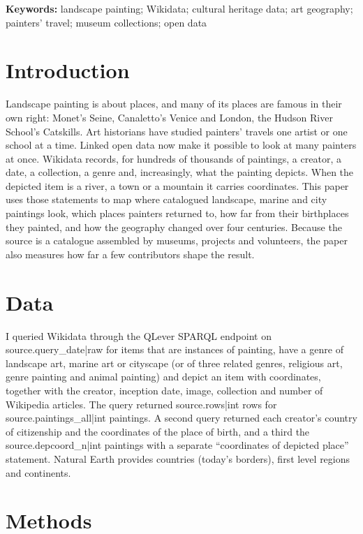 \documentclass[11pt,a4paper]{article}
\begin{document}
\textbf{Keywords:} landscape painting; Wikidata; cultural heritage data; art geography; painters' travel; museum collections; open data

\section{Introduction}
Landscape painting is about places, and many of its places are famous in their own right: Monet's Seine, Canaletto's Venice and London, the Hudson River School's Catskills. Art historians have studied painters' travels one artist or one school at a time. Linked open data now make it possible to look at many painters at once. Wikidata records, for hundreds of thousands of paintings, a creator, a date, a collection, a genre and, increasingly, what the painting depicts. When the depicted item is a river, a town or a mountain it carries coordinates. This paper uses those statements to map where catalogued landscape, marine and city paintings look, which places painters returned to, how far from their birthplaces they painted, and how the geography changed over four centuries. Because the source is a catalogue assembled by museums, projects and volunteers, the paper also measures how far a few contributors shape the result.

\section{Data}
I queried Wikidata \citep{wikidata} through the QLever SPARQL endpoint \citep{qlever} on {{source.query_date|raw}} for items that are instances of painting, have a genre of landscape art, marine art or cityscape (or of three related genres, religious art, genre painting and animal painting) and depict an item with coordinates, together with the creator, inception date, image, collection and number of Wikipedia articles. The query returned {{source.rows|int}} rows for {{source.paintings_all|int}} paintings. A second query returned each creator's country of citizenship and the coordinates of the place of birth, and a third the {{source.depcoord_n|int}} paintings with a separate ``coordinates of depicted place'' statement. Natural Earth \citep{naturalearth} provides countries (today's borders), first level regions and continents.

\section{Methods}
\end{document}
